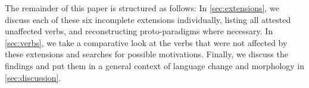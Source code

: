 The remainder of this paper is structured as follows:
In \cref{sec:extensions}, we discuss each of these six incomplete extensions individually, listing all attested unaffected verbs, and reconstructing proto-paradigms where necessary.
In \cref{sec:verbs}, we take a comparative look at the verbs that were not affected by these extensions and searches for possible motivations.
Finally, we discuss the findings and put them in a general context of language change and morphology in \cref{sec:discussion}.



%
